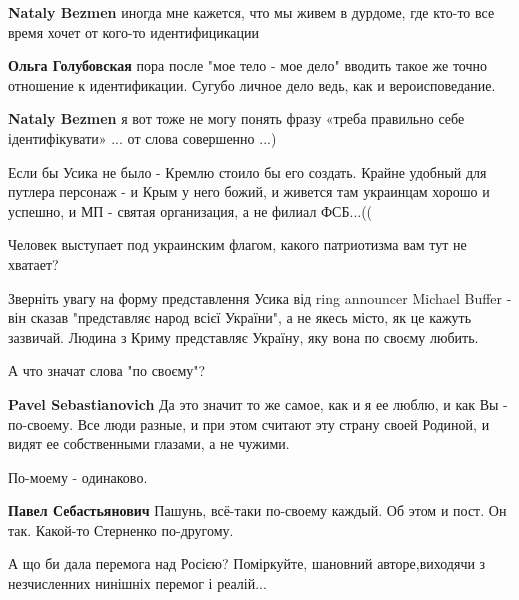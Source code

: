 \begin{itemize}
\begin{itemize}

\textbf{Nataly Bezmen} иногда мне кажется, что мы живем в дурдоме, где кто-то все время хочет от кого-то идентифицикации

\textbf{Ольга Голубовская} пора после "мое тело - мое дело" вводить такое же точно отношение к идентификации. Сугубо личное дело ведь, как и вероисповедание.


\textbf{Nataly Bezmen} я вот тоже не могу понять фразу «треба правильно себе ідентифікувати» ... от слова совершенно ...)
\end{itemize} %


Если бы Усика не было - Кремлю стоило бы его создать. Крайне удобный для
путлера персонаж - и Крым у него божий, и живется там украинцам хорошо и
успешно, и МП - святая организация, а не филиал ФСБ...((


Человек выступает под украинским флагом, какого патриотизма вам тут не хватает?


Зверніть увагу на форму представлення Усика від ring announcer Michael Buffer -
він сказав "представляє народ всієї України", а не якесь місто, як це кажуть
зазвичай. Людина з Криму представляє Україну, яку вона по своєму любить.

\begin{itemize} %

А что значат слова "по своєму"?

\textbf{Pavel Sebastianovich} Да это значит то же самое, как и я ее люблю, и как Вы - по-своему. Все люди разные, и при этом считают эту страну своей Родиной, и видят ее собственными глазами, а не чужими.


По-моему - одинаково.


\textbf{Павел Себастьянович} Пашунь, всё-таки по-своему каждый. Об этом и пост. Он так. Какой-то Стерненко по-другому.
\end{itemize} %

А що би дала перемога над Росією? Поміркуйте, шановний авторе,виходячи з незчисленних нинішніх перемог і реалій...


\end{itemize}
